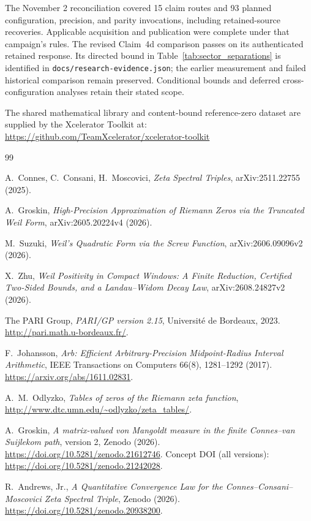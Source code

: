 \documentclass[11pt,a4paper]{article}
\begin{document}
The November 2 reconciliation covered 15 claim routes and 93 planned
configuration, precision, and parity invocations, including retained-source
recoveries. Applicable acquisition and publication were complete under
that campaign's rules. The revised
Claim~4d comparison passes on its authenticated retained response. Its
directed bound in Table~\ref{tab:sector_separations} is identified in
\texttt{docs/research-evidence.json}; the earlier measurement and failed
historical comparison remain preserved. Conditional bounds and deferred
cross-configuration analyses retain their stated scope.

\noindent The shared mathematical library and content-bound reference-zero
dataset are supplied by the Xcelerator Toolkit at:\\
{\small\url{https://github.com/TeamXcelerator/xcelerator-toolkit}}

\small
\begin{thebibliography}{99}

A.~Connes, C.~Consani, H.~Moscovici,
\emph{Zeta Spectral Triples},
arXiv:2511.22755 (2025).

A.~Groskin,
\emph{High-Precision Approximation of Riemann Zeros via the Truncated
Weil Form},
arXiv:2605.20224v4 (2026).

M.~Suzuki,
\emph{Weil's Quadratic Form via the Screw Function},
arXiv:2606.09096v2 (2026).

X.~Zhu,
\emph{Weil Positivity in Compact Windows: A Finite Reduction,
Certified Two-Sided Bounds, and a Landau--Widom Decay Law},
arXiv:2608.24827v2 (2026).

The PARI Group,
\emph{PARI/GP version 2.15},
Universit\'e de Bordeaux, 2023.
\url{http://pari.math.u-bordeaux.fr/}.

F.~Johansson,
\emph{Arb: Efficient Arbitrary-Precision Midpoint-Radius Interval Arithmetic},
IEEE Transactions on Computers 66(8), 1281--1292 (2017).
\url{https://arxiv.org/abs/1611.02831}.

A.~M.~Odlyzko,
\emph{Tables of zeros of the Riemann zeta function},
\url{http://www.dtc.umn.edu/~odlyzko/zeta_tables/}.

A.~Groskin,
\emph{A matrix-valued von Mangoldt measure in the finite
Connes--van Suijlekom path},
version 2, Zenodo (2026).
\url{https://doi.org/10.5281/zenodo.21612746}.
Concept DOI (all versions):
\url{https://doi.org/10.5281/zenodo.21242028}.

R.~Andrews, Jr.,
\emph{A Quantitative Convergence Law for the
Connes--Consani--Moscovici Zeta Spectral Triple},
Zenodo (2026).
\url{https://doi.org/10.5281/zenodo.20938200}.

\end{thebibliography}
\normalsize
\end{document}
